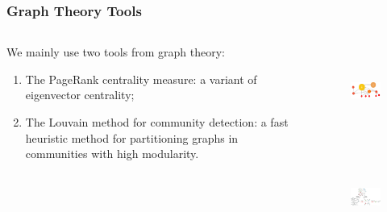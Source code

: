\documentclass{beamer}
\theoremstyle{definition}
\theoremstyle{plain}
\theoremstyle{Remark}
\begin{document}
	\begin{frame}
		\frametitle{Graph Theory Tools}
	\pause
	\begin{columns}
		\begin{column}{0.5\textwidth}
	We mainly use two tools from graph theory:\pause
	\begin{enumerate}
		\item The PageRank centrality measure: a variant of eigenvector centrality;\pause
		\item The Louvain method for community detection: a fast heuristic method for partitioning graphs in communities with high modularity.\pause
	\end{enumerate}\end{column}
		\begin{column}{0.5\textwidth}
	\begin{figure}
		\includegraphics[height=3cm, width=5cm]{pagerank.jpg}
	\end{figure}
	\begin{figure}
		\includegraphics[height=3cm, width=5cm]{louvain.png}

	\end{figure}

\end{column}
	\end{columns}
		
		
	\end{frame}
\end{document}
